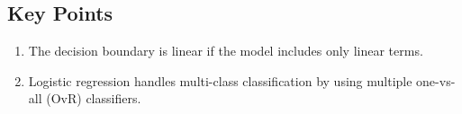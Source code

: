 \documentclass{article}
\begin{document}
\subsection*{Key Points}
\begin{enumerate}
    \item The decision boundary is linear if the model includes only linear terms.
    \item Logistic regression handles multi-class classification by using multiple one-vs-all (OvR) classifiers.
\end{enumerate}
\end{document}
